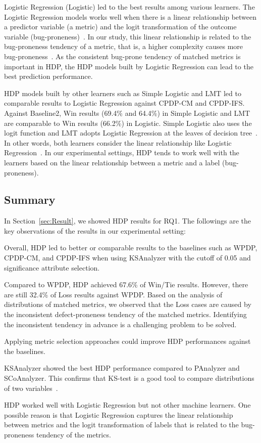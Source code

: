 Logistic Regression (Logistic) led to the best results among various
learners. The Logistic Regression models works well when there is a linear
relationship between a predictor variable (a metric) and the logit
transformation of the outcome variable (bug-proneness)~\cite{Logstic}.
In our study, this linear relationship is related to the bug-proneness tendency of
a metric, that is, a higher complexity causes more bug-proneness~\cite{DAmbros12,Menzies07,Rahman13}.
As the consistent bug-prone tendency of matched metrics is important in HDP, the
HDP models built by Logistic Regression can lead to the best prediction
performance.

HDP models built by other learners such as
Simple Logistic and LMT led to comparable results to Logistic Regression against
CPDP-CM and CPDP-IFS. Against Baseline2, Win results (69.4\% and 64.4\%) in
Simple Logistic and LMT are comparable to Win results (66.2\%) in Logistic.
Simple Logistic also uses the logit function and LMT adopts Logistic
Regression at the leaves of decision tree~\cite{Ghotra15}. In other words, both
learners consider the linear relationship like Logistic
Regression~\cite{Logstic}. In our experimental settings, HDP tends to
work well with the learners based on the linear relationship between a metric
and a label (bug-proneness).

\subsection{Summary}
In Section~\ref{sec:Result}, we showed HDP results for RQ1. The followings are the key observations of the results in our experimental setting:
\squishlist
    \item Overall, HDP led to better or comparable results to the baselines such as WPDP, CPDP-CM, and CPDP-IFS when using KSAnalyzer with the cutoff of 0.05 and significance attribute selection.
    \item Compared to WPDP, HDP achieved 67.6\% of Win/Tie results. However, there are still 32.4\% of Loss results against WPDP. Based on the analysis of distributions of matched metrics, we observed that the Loss cases are caused by the inconsistent defect-proneness tendency of the matched metrics. Identifying the inconsistent tendency in advance is a challenging problem to be solved. 
    \item Applying metric selection approaches could improve HDP performances against the baselines.
    \item KSAnalyzer showed the best HDP performance compared to PAnalyzer and SCoAnalyzer. This confirms that KS-test is a good tool to compare distributions of two variables~\cite{Lilliefors67,Massey51}.
    \item HDP worked well with Logistic Regression but not other machine learners. One possible reason is that Logistic Regression captures the linear relationship between metrics and the logit transformation of labels that is related to the bug-proneness tendency of the metrics.
\squishend
